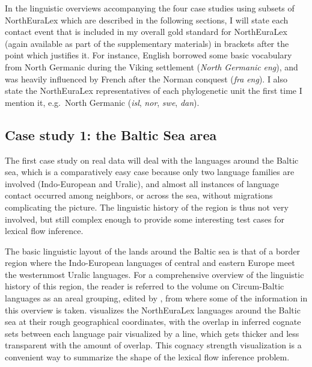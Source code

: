 In the linguistic overviews accompanying the four case studies using subsets of NorthEuraLex which are described in the following sections, I will state each contact event that is included in my overall gold standard for NorthEuraLex (again available as part of the supplementary materials) in brackets after the point which justifies it. For instance, English borrowed some basic vocabulary from North Germanic during the Viking settlement (\textit{North Germanic} \arrowOA \textit{eng}), and was heavily influenced by French after the Norman conquest (\textit{fra} \arrowOA \textit{eng}). I also state the NorthEuraLex representatives of each phylogenetic unit the first time I mention it, e.g.\ North Germanic (\textit{isl}, \textit{nor}, \textit{swe}, \textit{dan}).

\subsection{Case study 1: the Baltic Sea area}
The first case study on real data will deal with the languages around the Baltic sea, which is a comparatively easy case because only two language families are involved (Indo-European and Uralic), and almost all instances of language contact occurred among neighbors, or across the sea, without migrations complicating the picture. The linguistic history of the region is thus not very involved, but still complex enough to provide some interesting test cases for lexical flow inference.

The basic linguistic layout of the lands around the Baltic sea is that of a border region where the Indo-European languages of central and eastern Europe meet the westernmost Uralic languages. For a comprehensive overview of the linguistic history of this region, the reader is referred to the volume on Circum-Baltic languages as an areal grouping, edited by \cite{dahl_koptjevskaja-tamm_2001}, from where some of the information in this overview is taken.  visualizes the NorthEuraLex languages around the Baltic sea at their rough geographical coordinates, with the overlap in inferred cognate sets between each language pair visualized by a line, which gets thicker and less transparent with the amount of overlap. This cognacy strength visualization is a convenient way to summarize the shape of the lexical flow inference problem.

